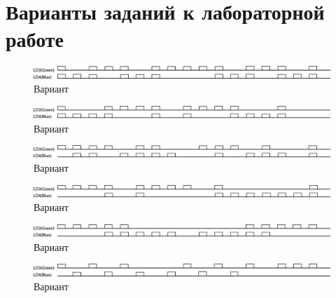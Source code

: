 \section{Варианты заданий к лабораторной работе }
\label{Lab1Var}
\begin{figure}[H]
\begin{center}
\includegraphics[scale=0.3]{Image/79.jpg} 
\end{center}
\caption{Вариант }
\end{figure}
\begin{figure}[H]
\begin{center}
\includegraphics[scale=0.3]{Image/80.jpg} 
\end{center}
\caption{Вариант }
\end{figure}
\begin{figure}[H]
\begin{center}
\includegraphics[scale=0.3]{Image/81.jpg} 
\end{center}
\caption{Вариант }
\end{figure}
\begin{figure}[H]
\begin{center}
\includegraphics[scale=0.3]{Image/82.jpg} 
\end{center}
\caption{Вариант }
\end{figure}
\begin{figure}[H]
\begin{center}
\includegraphics[scale=0.3]{Image/83.jpg} 
\end{center}
\caption{Вариант }
\end{figure}
\begin{figure}[H]
\begin{center}
\includegraphics[scale=0.3]{Image/84.jpg} 
\end{center}
\caption{Вариант }
\end{figure}
